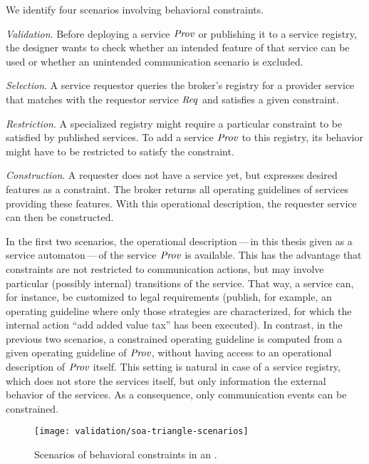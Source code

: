 We identify four scenarios involving behavioral constraints.

\begin{niceenumerate}
\item \emph{Validation}. Before deploying a service $\mathit{Prov}$ or publishing it to a service registry, the designer wants to check whether an intended feature of that service can be used or whether an unintended communication scenario is excluded.

\item \emph{Selection}. A service requestor queries the broker's registry for a provider service that matches with the requestor service $\mathit{Req}$ and satisfies a given constraint.

\item \emph{Restriction}. A specialized registry might require a particular constraint to be satisfied by published services. To add a service $\mathit{Prov}$ to this registry, its behavior might have to be restricted to satisfy the constraint.

\item \emph{Construction}. A requester does not have a service yet, but expresses desired features as a constraint. The broker returns all operating guidelines of services providing these features. With this operational description, the requester service can then be constructed.
\end{niceenumerate}

In the first two scenarios, the operational description\,---\,in this thesis given as a service automaton\,---\,of the service $\mathit{Prov}$ is available. This has the advantage that constraints are not restricted to communication actions, but may involve particular (possibly internal) transitions of the service. That way, a service can, for instance, be customized to legal requirements (publish, for example, an operating guideline where only those strategies are characterized, for which the internal action ``add added value tax'' has been executed). In contrast, in the previous two scenarios, a constrained operating guideline is computed from a given operating guideline of $\mathit{Prov}$, without having access to an operational description of $\mathit{Prov}$ itself. This setting is natural in case of a service registry, which does not store the services itself, but only information the external behavior of the services. As a consequence, only communication events can be constrained.

\begin{figure}
\centering
\texttt{[image: validation/soa-triangle-scenarios]}
\caption{Scenarios of behavioral constraints in an .}
\label{fig:3_scenarios}
\end{figure}

